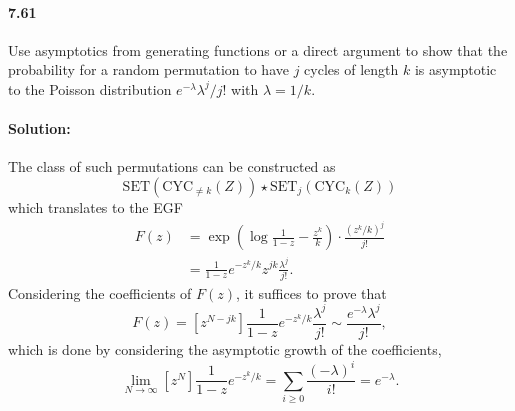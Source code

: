 \documentclass{article}
\begin{document}
\paragraph{7.61} Use asymptotics from generating functions or a direct argument
to show that the probability for a random permutation to have $j$ cycles of
length $k$ is asymptotic to the Poisson distribution $e^{-\lambda}\lambda^j/j!$
with $\lambda = 1/k$.

\paragraph{Solution:} The class of such permutations can be constructed as
\begin{equation*}
  \mathrm{SET}(\mathrm{CYC}_{\neq k}(Z)) \star
  \mathrm{SET}_j(\mathrm{CYC}_k(Z))
\end{equation*} which translates to the EGF \begin{align*}
  F(z) &= \exp\left(\log\frac{1}{1 - z} - \frac{z^k}{k}\right) \cdot
  \frac{(z^k/k)^j}{j!} \\
       &= \frac{1}{1 - z}e^{-z^k/k}z^{jk}\frac{\lambda^j}{j!}.
\end{align*} Considering the coefficients of $F(z)$, it suffices to prove that
\begin{equation*}
  [z^N]F(z) = [z^{N - jk}]\frac{1}{1 - z}e^{-z^k/k}\frac{\lambda^j}{j!} \sim
  \frac{e^{-\lambda}\lambda^j}{j!},
\end{equation*} which is done by considering the asymptotic growth of the
coefficients, \begin{equation*}
  \lim_{N \rightarrow \infty} [z^N]\frac{1}{1 - z}e^{-z^k/k} =
  \sum_{i \geq 0} \frac{(-\lambda)^i}{i!} = e^{-\lambda}.
\end{equation*}
\end{document}
